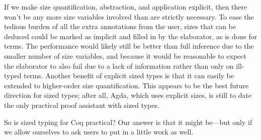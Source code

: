 If we make size quantification, abstraction, and application explicit,
then there won't be any more size variables involved than are strictly necessary.
To ease the tedious burden of all the extra annotations from the user,
sizes that can be deduced could be marked as implicit and filled in by the elaborator, as is done for terms.
The performance would likely still be better than full inference due to the smaller number of size variables,
and because it would be reasonable to expect the elaborator to also fail due to a lack of information rather than only on ill-typed terms.
Another benefit of explicit sized types is that it can easily be extended to higher-order size quantification.
This appears to be the best future direction for sized types;
after all, Agda, which uses explicit sizes,
is still to date the only practical proof assistant with sized types.

So is sized typing for Coq practical?
Our answer is that it might be---but only if we allow ourselves to ask users to put in a little work as well.

